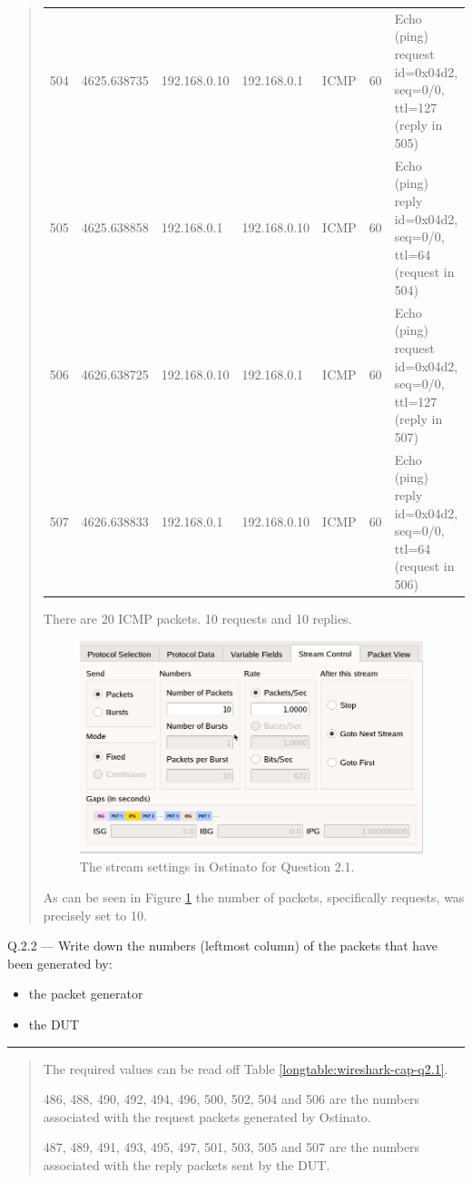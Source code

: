 \documentclass{article}
\newcommand\Que[2]{%
   \begin{samepage}
   \leavevmode\par
   \noindent
   Q.#1 --- #2\par\vspace{10pt}\hrule\vspace{10pt}
   \end{samepage}}
\newenvironment{ans}
   {\fbox{Answer}\begin{quote}}
   {\end{quote}}
\begin{document}
\begin{ans}
\begin{center}
\begin{longtable}{|l|l|l|l|l|l|p{10em}|}
504 & 4625.638735 & 192.168.0.10 & 192.168.0.1 & ICMP & 60 & Echo (ping)
request id=0x04d2, seq=0/0, ttl=127 (reply in 505) \\
505 & 4625.638858 & 192.168.0.1 & 192.168.0.10 & ICMP & 60 & Echo (ping)
reply id=0x04d2, seq=0/0, ttl=64 (request in 504) \\
506 & 4626.638725 & 192.168.0.10 & 192.168.0.1 & ICMP & 60 & Echo (ping)
request id=0x04d2, seq=0/0, ttl=127 (reply in 507) \\
507 & 4626.638833 & 192.168.0.1 & 192.168.0.10 & ICMP & 60 & Echo (ping)
reply id=0x04d2, seq=0/0, ttl=64 (request in 506) \\
\end{longtable}
\end{center}

There are 20 ICMP packets. 10 requests and 10 replies.

\begin{figure}[H]
   \centering
   \includegraphics[width=10cm]{data/q2.1-stream-settings.png}
   \caption{The stream settings in Ostinato for Question 2.1.}
   \label{fig:stream-settings-q2.1}
\end{figure}

As can be seen in Figure \ref{fig:stream-settings-q2.1} the
number of packets, specifically requests, was precisely set to
10.

\end{ans}

\Que{2.2}{Write down the numbers (leftmost column) of the packets that have been generated by:
\begin{itemize}
\item the packet generator
\item the DUT
\end{itemize}
}
\begin{ans}
The required values can be read off Table
\ref{longtable:wireshark-cap-q2.1}.

486, 488, 490, 492, 494, 496, 500, 502, 504 and 506 are the
numbers associated with the request packets generated by
Ostinato.

487, 489, 491, 493, 495, 497, 501, 503, 505 and 507 are the
numbers associated with the reply packets sent by the DUT.
\end{ans}
\end{document}
